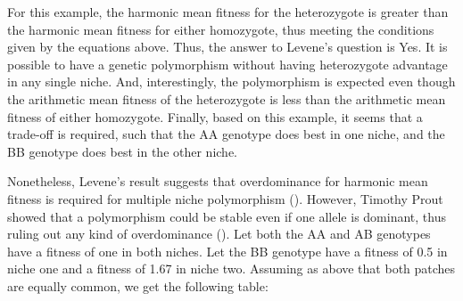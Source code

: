 \documentclass[
  letterpaper,
]{book}
\begin{document}
For this example, the harmonic mean fitness for the heterozygote is
greater than the harmonic mean fitness for either homozygote, thus
meeting the conditions given by the equations above. Thus, the answer to
Levene's question is Yes. It is possible to have a genetic polymorphism
without having heterozygote advantage in any single niche. And,
interestingly, the polymorphism is expected even though the arithmetic
mean fitness of the heterozygote is less than the arithmetic mean
fitness of either homozygote. Finally, based on this example, it seems
that a trade-off is required, such that the AA genotype does best in one
niche, and the BB genotype does best in the other niche.

Nonetheless, Levene's result suggests that overdominance for harmonic
mean fitness is required for multiple niche polymorphism
(). However, Timothy Prout showed
that a polymorphism could be stable even if one allele is dominant, thus
ruling out any kind of overdominance ().
Let both the AA and AB genotypes have a fitness of one in both niches.
Let the BB genotype have a fitness of 0.5 in niche one and a fitness of
1.67 in niche two. Assuming as above that both patches are equally
common, we get the following table:
\end{document}
